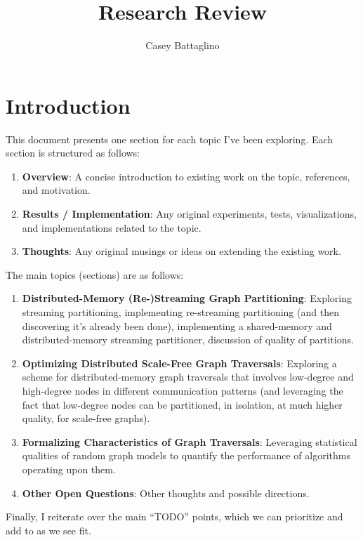 \documentclass[11pt]{article}
\title{Research Review}
\author{Casey Battaglino}
\begin{document}
\maketitle


\section{Introduction}

This document presents one section for each topic I've been exploring. Each section is structured as follows:
\begin{enumerate}
\item \textbf{Overview}: A concise introduction to existing work on the topic, references, and motivation.
\item \textbf{Results / Implementation}: Any original experiments, tests, visualizations, and implementations related to the topic.
\item \textbf{Thoughts}: Any original musings or ideas on extending the existing work.
\end{enumerate}

The main topics (sections) are as follows:

\begin{enumerate}
\item \textbf{Distributed-Memory (Re-)Streaming Graph Partitioning}: Exploring streaming partitioning, implementing re-streaming partitioning (and then discovering it's already been done), implementing a shared-memory and distributed-memory streaming partitioner, discussion of quality of partitions. 
\item \textbf{Optimizing Distributed Scale-Free Graph Traversals}: Exploring a scheme for distributed-memory graph traversals that involves low-degree and high-degree nodes in different communication patterns (and leveraging the fact that low-degree nodes can be partitioned, in isolation, at much higher quality, for scale-free graphs). 
\item \textbf{Formalizing Characteristics of Graph Traversals}: Leveraging statistical qualities of random graph models to quantify the performance of algorithms operating upon them. 
\item \textbf{Other Open Questions}: Other thoughts and possible directions.
\end{enumerate}

Finally, I reiterate over the main ``TODO'' points, which we can prioritize and add to as we see fit. 
\end{document}
